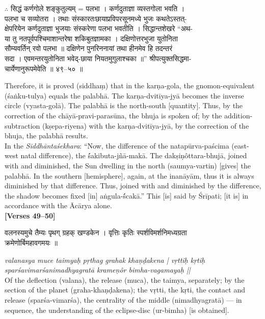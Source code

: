 \documentclass[11pt,a4paper]{article}
\newcommand{\dev}[1]{{\devanagarifont #1}}
\newcommand{\bilingualpair}[2]{%
  \noindent%
  \begin{minipage}[t]{0.48\textwidth}
    #1%
  \end{minipage}%
  \hfill%
  \begin{minipage}[t]{0.48\textwidth}
    #2%
  \end{minipage}%
  \par\vspace{0.5em}%
}
\newenvironment{sanskritcol}{\devanagarifont\small}{}
\newenvironment{englishcol}{\iastfont\small}{}
\begin{document}
\vspace{0.3cm}
\bilingualpair{%
\begin{sanskritcol}
\dev{$\therefore$ सिद्धं कर्णगोले शङ्कुतुल्यम् = पलभा । कर्णदुताज्ञा व्यस्तगोला भवति ।}\\[0.3em]
\dev{पलभा च सव्योतरा । तथाः संस्कारतःछायाप्रविपरसूनमध्ये भुजः कथतेऽस्तत्-}\\[0.3em]
\dev{क्षेपरियेन कर्णदुताज्ञा भुजयाः संस्करेणा पलभा भवतीति । सिद्धान्तशेखरे ``अथ-}\\[0.3em]
\dev{या तु नतपूर्वपश्चिमाशान्तरेषा शकिबुतज्ञामका । दक्षिणोत्तरभुजा युतोनिता}\\[0.3em]
\dev{सौम्यवर्तिन् रवो पलभा ॥ दक्षिणेन पुनरिननायां तथा हीनमेव हि तदन्तरं}\\[0.3em]
\dev{सदा । एवमन्तरयुतोनिता भवेद्-छाया नियतमुगुलाश्चका ॥'' श्रीपत्युक्तसिद्धमा-}\\[0.3em]
\dev{चार्येणानुरूपमेवेति ॥ ४९--५० ॥}
\end{sanskritcol}%
}{%
\begin{englishcol}
Therefore, it is proved (siddhaṃ) that in the karṇa-gola, the gnomon-\-equivalent (\'saṅku-tulya) equals the palabhā. The karṇa-dvitīya-jyā becomes the inverse circle (vyasta-golā). The palabhā is the north-\-south [quantity]. Thus, by the correction of the chāyā-pravi-parasūna, the bhuja is spoken of; by the addition-\-subtraction (kṣepa-riyena) with the karṇa-dvitīya-jyā, by the correction of the bhuja, the palabhā results.\\[0.3em]
In the \textit{Siddhānta\'sek\-{}hara}: ``Now, the difference of the natapūrva-paścima (east-\-west natal difference), the \'śakibuta-jñā-makā. The dakṣiṇôttara-bhujā, joined with and diminished, the Sun dwelling in the north (saumya-vartin) [gives] the palabhā. In the southern [hemisphere], again, at the inanāyām, thus it is always diminished by that difference. Thus, joined with and diminished by the difference, the shadow becomes fixed [in] aṅgula-\'ścakā.'' This [is] said by Śrīpati; [it is] in accordance with the Ācārya alone.\\[0.3em]
\hfill \textbf{[Verses 49--50]}
\end{englishcol}%
}

\vspace{0.5cm}
\bilingualpair{%
\begin{sanskritcol}
\dev{वलनस्यमुचे तैम्यः पृथग् ग्रहक् खण्डकेन । वृत्तिः कृतिः स्पर्शविमर्शनिमध्यग्रता}\\[0.3em]
\dev{क्रमेणोर्बिमहावगमयः ॥}
\end{sanskritcol}%
}{%
\begin{englishcol}
\textit{valanasya muce taimyaḥ pṛthag grahak khaṇḍakena | vṛttiḥ kṛtiḥ sparśavimarśanimadhyagratā krameṇôr bimha-vagamayaḥ ||}\\[0.3em]
Of the deflection (valana), the release (muca), the taimya, separately; by the section of the planet (graha-khaṇḍakena); the vṛtti, the kṛti, the contact and release (sparśa-vimarśa), the centrality of the middle (nimadhyagratā) --- in sequence, the understanding of the eclipse-\-disc (ur-bimha) [is obtained].
\end{englishcol}%
}
\end{document}
